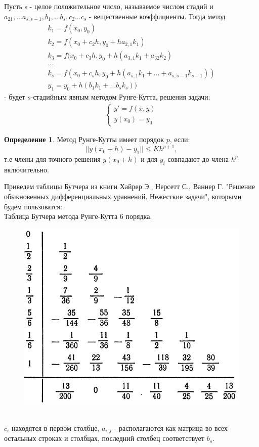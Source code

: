 \documentclass[12pt, a4paper] {article}
\theoremstyle{remark}
\theoremstyle{definition}
\newtheorem{defin}{Определение}
\begin{document}
Пусть s - целое положительное число, называемое числом стадий и $a_{21}, \dots a_{s,s-1}, b_{1}, \dots b_{s}, c_{2} \dots c_{s}$ - вещественные коэффициенты. Тогда метод
\begin{gather}
k_1 = f (x_0, y_0) \nonumber\\
k_2 = f (x_0 + c_2h, y_0 + h a_{2,1} k_1) \nonumber \\
k_3 = f (x_0 + c_3h, y_0 + h (a_{3,1} k_1 + a_{32} k_2) \nonumber\\
\dots \nonumber\\
k_s = f (x_0 + c_s h, y_0 + h(a_{s,1} k_1 + \dots + a_{s,s-1}k_{s-1} ))\nonumber \\
y_1 = y_0 + h (b_1k_1 + \dots b_s k_s))
\end{gather} - будет $s$-стадийным явным методом Рунге-Кутта, решения задачи:
\begin{gather}
\begin{cases}
y' = f(x, y) \\
y(x_0) = y_0
\end{cases}
\end{gather}
\begin{defin}
Метод Рунге-Кутты имеет порядок $p$, если:
 $$ || y(x_0 + h) - y_1 || \le Kh^{p+1},$$
 т.е члены для точного решения $y(x_0 + h)$ и для $y_i$ совпадают до члена $h^p$ включительно.
\end{defin}
Приведем таблицы Бутчера из книги Хайрер Э., Нерсетт С., Ваннер Г. "Решение обыкновенных дифференциальных уравнений. Нежесткие задачи", которыми будем пользоватся: \\
Таблица Бутчера метода Рунге-Кутта 6 порядка.\\
\begin{figure}[h!]
\centering
\includegraphics[width=0.5\linewidth]{butcher6.png} 
\end{figure}
\\
$c_i$ находятся в первом столбце, $a_{i,j}$ - располагаются как матрица во всех остальных строках и столбцах, последний столбец соответствует  $b_s.$
\end{document}
